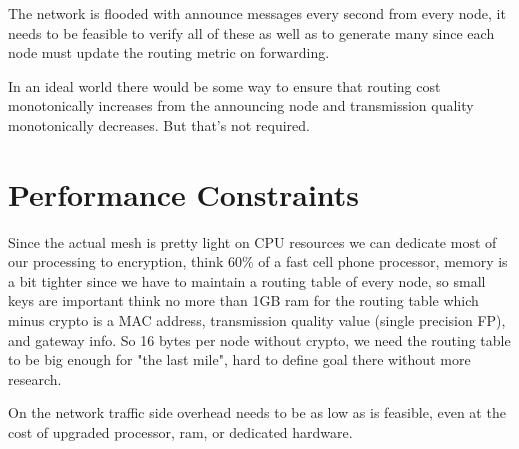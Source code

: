 \documentclass[11pt]{article}
\begin{document}
The network is flooded with announce messages every second from every node, it needs to be feasible to verify all of these as well as to generate many since each node must update the routing metric on forwarding. 

In an ideal world there would be some way to ensure that routing cost monotonically increases from the announcing node and transmission quality monotonically decreases. But that's not required.

\section{Performance Constraints}

Since the actual mesh is pretty light on CPU resources we can dedicate most of our processing to encryption, think 60\% of a fast cell phone processor, memory is a bit tighter since we have to maintain a routing table of every node, so small keys are important think no more than 1GB ram for the routing table which minus crypto is a MAC address, transmission quality value (single precision FP), and gateway info. So 16 bytes per node without crypto, we need the routing table to be big enough for "the last mile", hard to define goal there without more research. 

On the network traffic side overhead needs to be as low as is feasible, even at the cost of upgraded processor, ram, or dedicated hardware. 
\end{document}
